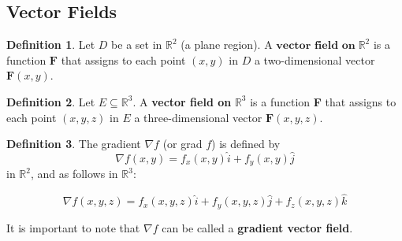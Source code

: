 \documentclass[12pt, a4paper]{article}
\theoremstyle{plain}
\theoremstyle{definition}
\newtheorem{definition}{Definition}[section]
\theoremstyle{remark}
\newcommand{\RR}{\mathbb{R}}
\begin{document}
\newpage

\subsection{Vector Fields}

\begin{definition} Let $D$ be a set in $\RR^2$ (a plane region). A $\textbf{vector field on} \; \RR^2$ is a function $\textbf{F}$ that assigns to each point $(x,y)$ in $D$ a two-dimensional vector $\textbf{F}(x,y)$.
\end{definition}


\begin{definition} Let $E \subseteq \RR^3$. A \textbf{vector field on} $ \RR^3$ is a function \textbf{F} that assigns to each point $(x, y, z)$ in $E$ a three-dimensional vector $\textbf{F}(x, y, z)$.
\end{definition}


\begin{definition} The gradient $\nabla  f$ (or grad $f$) is defined by 
$$ \nabla f(x, y) = f_x(x, y) \hat{i} + f_y(x, y) \hat{j}$$
in $\RR^2$, and as follows in $\RR^3$:

$$ \nabla f(x, y, z) = f_x(x, y, z) \hat{i} + f_y(x, y, z) \hat{j} +f_z(x, y, z) \hat{k}$$

It is important to note that $\nabla f$ can be called a \textbf{gradient vector field}.
\end{definition}

\end{document}
